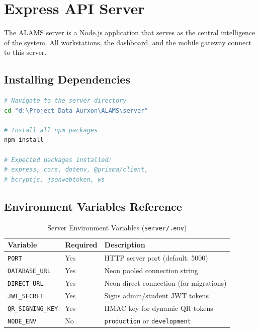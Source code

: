 \chapter{Express API Server}
\label{ch:server}

The ALAMS server is a Node.js application that serves as the central intelligence of the system. All workstations, the dashboard, and the mobile gateway connect to this server.

\section{Installing Dependencies}

\begin{tcolorbox}[codebox, title={Install Server Dependencies}]
\begin{lstlisting}[language=bash]
# Navigate to the server directory
cd "d:\Project Data Aurxon\ALAMS\server"

# Install all npm packages
npm install

# Expected packages installed:
# express, cors, dotenv, @prisma/client,
# bcryptjs, jsonwebtoken, ws
\end{lstlisting}
\end{tcolorbox}

\section{Environment Variables Reference}

\begin{table}[h!]
\centering
\caption{Server Environment Variables (\texttt{server/.env})}
\label{tab:env-vars}
\begin{tabularx}{\textwidth}{llX}
\toprule
\textbf{Variable} & \textbf{Required} & \textbf{Description}\\
\midrule
\rowcolor{aurxonlightgray}
\texttt{PORT} & Yes & HTTP server port (default: 5000)\\
\texttt{DATABASE\_URL} & Yes & Neon pooled connection string\\
\rowcolor{aurxonlightgray}
\texttt{DIRECT\_URL} & Yes & Neon direct connection (for migrations)\\
\texttt{JWT\_SECRET} & Yes & Signs admin/student JWT tokens\\
\rowcolor{aurxonlightgray}
\texttt{QR\_SIGNING\_KEY} & Yes & HMAC key for dynamic QR tokens\\
\texttt{NODE\_ENV} & No & \texttt{production} or \texttt{development}\\
\bottomrule
\end{tabularx}
\end{table}

